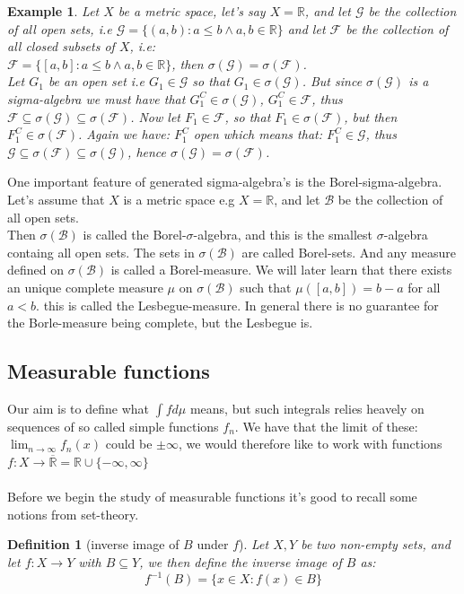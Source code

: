 \documentclass{article}
\newcommand{\R}{\mathbb{R}}
\newcommand{\G}{\mathcal{G}}
\newcommand{\F}{\mathcal{F}}
\newcommand{\Rbar}{\overline{\mathbb{R}}}%
\newcommand{\B}{\mathcal{B}}
\newtheorem{definition}{Definition}
\newtheorem{ex}{Example}
\begin{document}
\begin{ex}
Let $X$ be a metric space, let's say $X=\R$, and let $\G$ be the collection of all open sets, i.e $\G =  \{(a,b): a\leq b \wedge a,b \in \R\}$ and let $\F$ be the collection of all closed subsets of $X$, i.e: \\
$\F =  \{[a,b]: a\leq b \wedge a,b\in \R\}$, then $\sigma(\G) = \sigma(\F)$. \\ 
Let $G_{1}$ be an open set i.e $G_{1}\in \G$ so that $G_{1}\in \sigma(\G)$. But since $\sigma(\G)$ is a sigma-algebra we must have that $G_{1}^{C} \in \sigma(\G)$, $G_{1}^{C}\in \F$, thus $\F \subseteq \sigma(\G) \subseteq \sigma(\F)$. Now let $F_{1} \in \F$, so that $F_{1}\in \sigma(\F)$, but then $F_{1}^{C}\in \sigma(\F)$. Again we have: $F_{1}^{C}$ open which means that: $F_{1}^{C}\in \G$, thus $\G\subseteq \sigma(\F) \subseteq \sigma(\G)$, hence $\sigma(\G) = \sigma(\F)$. 
\end{ex}



One important feature of generated sigma-algebra's is the Borel-sigma-algebra. Let's assume that $X$ is a metric space e.g $X = \R$, and let $\B$ be the collection of all open sets.\\
Then $\sigma(\B)$ is called the Borel-$\sigma$-algebra, and this is the smallest $\sigma$-algebra containg all open sets. The sets in $\sigma(\B)$ are called Borel-sets. And any measure defined on $\sigma(\B)$ is called a Borel-measure. We will later learn that there exists an unique complete measure $\mu$ on $\sigma(\B)$ such that $\mu([a,b]) = b-a$ for all $a<b$. this is called the Lesbegue-measure. In general there is no guarantee for the Borle-measure being complete, but the Lesbegue is. 




\subsection{Measurable functions}
Our aim is to define what $\int fd\mu$ means, but such integrals relies heavely on sequences of so called simple functions $f_{n}$. We have that the limit of these: $\lim_{n\to \infty}f_{n}(x)$ could be $\pm \infty$, we would therefore like to work with functions $f:X\to \Rbar = \R\cup \{-\infty, \infty\}$ 
\\~\\ 
Before we begin the study of measurable functions it's good to recall some notions from set-theory. 

\begin{definition}[inverse image of $B$ under $f$]
Let $X,Y$ be two non-empty sets, and let $f:X\to Y$ with $B\subseteq Y$, we then define the inverse image of $B$ as: 
\[f^{-1}(B) = \{x\in X: f(x)\in B\}
\]
\end{definition} 
\end{document}
